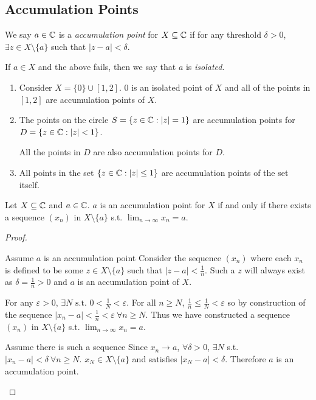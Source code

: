 \documentclass[../main.tex]{subfiles}
\begin{document}
\subsection{Accumulation Points}
\begin{definition}
  We say $a \in \mathbb{C}$ is a \textit{accumulation point} for $X \subseteq \mathbb{C}$ if for any threshold $\delta > 0$, $\exists z \in X \setminus \{a\}$ such that $|z - a| < \delta$.

  If $a \in X$ and the above fails, then we say that $a$ is \textit{isolated}.
\end{definition}
\begin{example}
  \begin{enumerate}
    \item Consider $X = \{0\} \cup [1, 2]$.
      $0$ is an isolated point of $X$ and all of the points in $[1, 2]$ are accumulation points of $X$.
    \item The points on the circle $S = \{z \in \mathbb{C}: |z| = 1\}$ are accumulation points for $D = \{z \in \mathbb{C} : |z| < 1\}$.

      All the points in $D$ are also accumulation points for $D$.
    \item All points in the set $\{z \in \mathbb{C}: |z| \leq 1\}$ are accumulation points of the set itself.
  \end{enumerate}
\end{example}
\begin{lemma}
  Let $X \subseteq \mathbb{C}$ and $a \in \mathbb{C}$.
  $a$ is an accumulation point for $X$ if and only if there exists a sequence $(x_n)$ in $X \setminus \{a\}$ s.t. $\lim_{n \to \infty} x_n = a$.
  \label{accumulationSequence}
\end{lemma}
\begin{proof}
  \begin{proofdirection}{Assume $a$ is an accumulation point}
    Consider the sequence $(x_n)$ where each $x_n$ is defined to be some $z \in X \setminus \{a\}$ such that $|z - a| < \frac{1}{n}$.
    Such a $z$ will always exist as $\delta = \frac{1}{n} > 0$ and $a$ is an accumulation point of $X$.

    For any $\varepsilon > 0$, $\exists N \text{ s.t. } 0 < \frac{1}{N} < \varepsilon$.
    For all $n \geq N$, $\frac{1}{n} \leq \frac{1}{N} < \varepsilon$ so by construction of the sequence $|x_n - a| < \frac{1}{n} < \varepsilon\ \forall n \geq N$.
    Thus we have constructed a sequence $(x_n)$ in $X \setminus \{a\}$ s.t. $\lim_{n \to \infty} x_n = a$.
  \end{proofdirection}
  \begin{proofdirection}{Assume there is such a sequence}
    Since $x_n \to a$, $\forall \delta > 0$, $\exists N$ s.t. $|x_n - a| < \delta\ \forall n \geq N$.
    $x_N \in X \setminus \{a\}$ and satisfies $|x_N - a| < \delta$.
    Therefore $a$ is an accumulation point.
  \end{proofdirection}
\end{proof}
\end{document}
